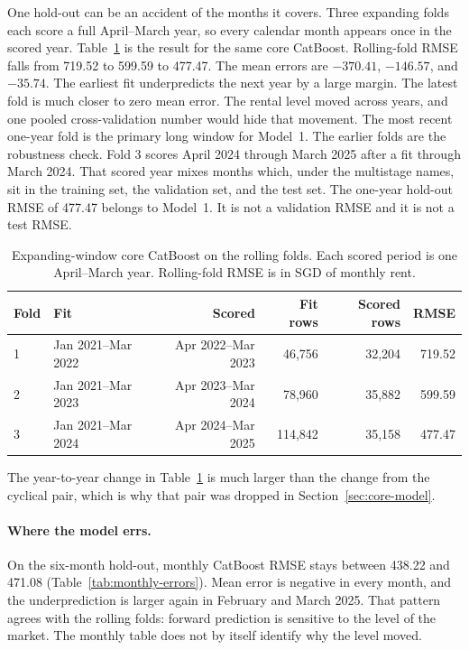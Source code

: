 \documentclass[11pt,a4paper]{article}
\begin{document}
One hold-out can be an accident of the months it covers.
Three expanding folds each score a full April--March year, so every calendar month appears once in the scored year.
Table~\ref{tab:rolling} is the result for the same core CatBoost.
Rolling-fold RMSE falls from 719.52 to 599.59 to 477.47.
The mean errors are \(-370.41\), \(-146.57\), and \(-35.74\).
The earliest fit underpredicts the next year by a large margin.
The latest fold is much closer to zero mean error.
The rental level moved across years, and one pooled cross-validation number would hide that movement.
The most recent one-year fold is the primary long window for Model~1.
The earlier folds are the robustness check.
Fold 3 scores April 2024 through March 2025 after a fit through March 2024.
That scored year mixes months which, under the multistage names, sit in the training set, the validation set, and the test set.
The one-year hold-out RMSE of 477.47 belongs to Model~1.
It is not a validation RMSE and it is not a test RMSE.

\begin{table}[htbp]
\centering
\caption{Expanding-window core CatBoost on the rolling folds.
Each scored period is one April--March year.
Rolling-fold RMSE is in SGD of monthly rent.}
\label{tab:rolling}
\small
\setlength{\tabcolsep}{4pt}
\begin{tabular}{@{}llrrrr@{}}
\toprule
Fold & Fit & Scored & Fit rows & Scored rows & RMSE \\
\midrule
1 & Jan 2021--Mar 2022 & Apr 2022--Mar 2023 & 46{,}756 & 32{,}204 & 719.52 \\
2 & Jan 2021--Mar 2023 & Apr 2023--Mar 2024 & 78{,}960 & 35{,}882 & 599.59 \\
3 & Jan 2021--Mar 2024 & Apr 2024--Mar 2025 & 114{,}842 & 35{,}158 & 477.47 \\
\bottomrule
\end{tabular}
\end{table}

The year-to-year change in Table~\ref{tab:rolling} is much larger than the change from the cyclical pair, which is why that pair was dropped in Section~\ref{sec:core-model}.

\paragraph{Where the model errs.}

On the six-month hold-out, monthly CatBoost RMSE stays between 438.22 and 471.08 (Table~\ref{tab:monthly-errors}).
Mean error is negative in every month, and the underprediction is larger again in February and March 2025.
That pattern agrees with the rolling folds: forward prediction is sensitive to the level of the market.
The monthly table does not by itself identify why the level moved.
\end{document}
